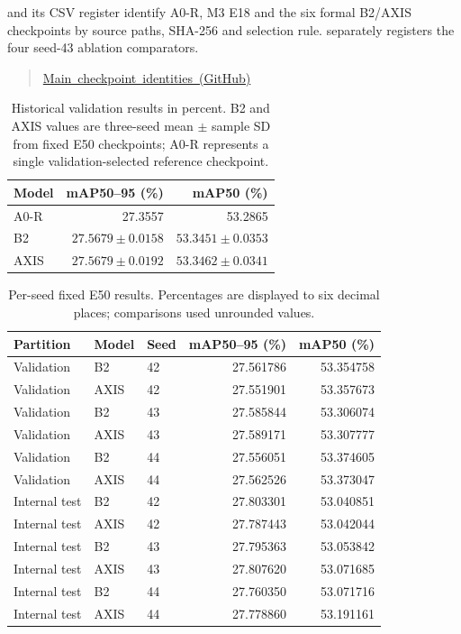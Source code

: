  and its CSV register identify A0-R, M3 E18 and the six formal B2/AXIS checkpoints by source paths, SHA-256 and selection rule.  separately registers the four seed-43 ablation comparators.

\begin{quote}\small\mbox{\href{https://github.com/HopperHou/X-ray-thesis/blob/81d585e01480ccafe99ac60ebf1806db7b84758c/supplementary/seed43-component-ablation/MAIN_CHECKPOINTS.json}{Main checkpoint identities (GitHub)}}\end{quote}



\begin{table}[htbp]
\centering
\small
\begin{tabular}{lrr}
\toprule
Model & mAP50--95 (\%) & mAP50 (\%) \\
\midrule
A0-R & 27.3557 & 53.2865 \\
B2 & \(27.5679\pm0.0158\) & \(53.3451\pm0.0353\) \\
AXIS & \(27.5679\pm0.0192\) & \(53.3462\pm0.0341\) \\
\bottomrule
\end{tabular}
\caption{Historical validation results in percent. B2 and AXIS values are three-seed mean $\pm$ sample SD from fixed E50 checkpoints; A0-R represents a single validation-selected reference checkpoint.}
\label{tab:validation-main}
\end{table}

\begin{table}[htbp]
\centering
\small
\begin{tabular}{lllrr}
\toprule
Partition & Model & Seed & mAP50--95 (\%) & mAP50 (\%) \\
\midrule
Validation & B2 & 42 & 27.561786 & 53.354758 \\
Validation & AXIS & 42 & 27.551901 & 53.357673 \\
Validation & B2 & 43 & 27.585844 & 53.306074 \\
Validation & AXIS & 43 & 27.589171 & 53.307777 \\
Validation & B2 & 44 & 27.556051 & 53.374605 \\
Validation & AXIS & 44 & 27.562526 & 53.373047 \\
Internal test & B2 & 42 & 27.803301 & 53.040851 \\
Internal test & AXIS & 42 & 27.787443 & 53.042044 \\
Internal test & B2 & 43 & 27.795363 & 53.053842 \\
Internal test & AXIS & 43 & 27.807620 & 53.071685 \\
Internal test & B2 & 44 & 27.760350 & 53.071716 \\
Internal test & AXIS & 44 & 27.778860 & 53.191161 \\
\bottomrule
\end{tabular}
\caption{Per-seed fixed E50 results. Percentages are displayed to six decimal places; comparisons used unrounded values.}
\label{tab:app-per-seed-results}
\end{table}

\FloatBarrier
